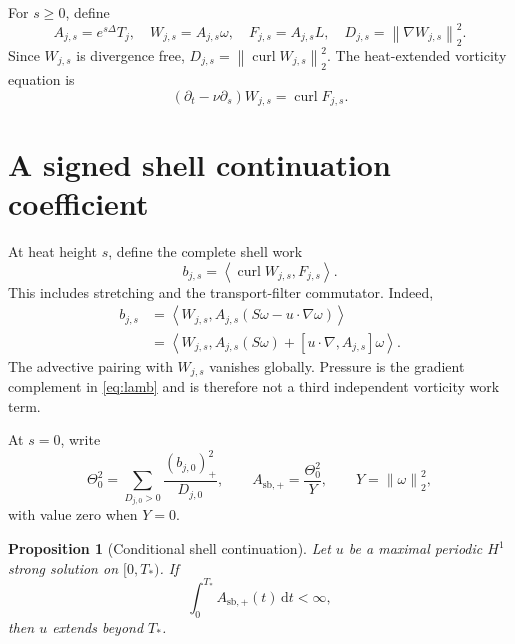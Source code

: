 \documentclass[11pt]{article}
\newtheorem{proposition}[theorem]{Proposition}
\theoremstyle{definition}
\newcommand{\curl}{\operatorname{curl}}
\newcommand{\ip}[2]{\left\langle #1,#2\right\rangle}
\newcommand{\norm}[1]{\left\lVert #1\right\rVert}
\newcommand{\pos}[1]{\left(#1\right)_{+}}
\newcommand{\dd}{\,\mathrm d}
\begin{document}
For \(s\ge0\), define
\begin{equation}\label{eq:heat-fields}
 A_{j,s}=e^{s\Delta}T_j,
 \quad W_{j,s}=A_{j,s}\omega,
 \quad F_{j,s}=A_{j,s}L,
 \quad D_{j,s}=\norm{\nabla W_{j,s}}_2^2.
\end{equation}
Since \(W_{j,s}\) is divergence free,
\(D_{j,s}=\norm{\curl W_{j,s}}_2^2\).  The heat-extended vorticity equation
is
\begin{equation}\label{eq:heat-vort}
 (\partial_t-\nu\partial_s)W_{j,s}=\curl F_{j,s}.
\end{equation}

\section{A signed shell continuation coefficient}\label{sec:criterion}

At heat height \(s\), define the complete shell work
\begin{equation}\label{eq:shell-work}
 b_{j,s}=\ip{\curl W_{j,s}}{F_{j,s}}.
\end{equation}
This includes stretching and the transport-filter commutator.  Indeed,
\begin{equation}\label{eq:compression}
\begin{aligned}
 b_{j,s}
 &=\ip{W_{j,s}}{A_{j,s}(S\omega-u\cdot\nabla\omega)}\\
 &=\ip{W_{j,s}}
 {A_{j,s}(S\omega)+[u\cdot\nabla,A_{j,s}]\omega}.
\end{aligned}
\end{equation}
The advective pairing with \(W_{j,s}\) vanishes globally.  Pressure is the
gradient complement in \eqref{eq:lamb} and is therefore not a third
independent vorticity work term.

At \(s=0\), write
\begin{equation}\label{eq:Asb}
 \Theta_0^2=\sum_{D_{j,0}>0}\frac{\pos{b_{j,0}}^2}{D_{j,0}},
 \qquad
 A_{\mathrm{sb},+}=\frac{\Theta_0^2}{Y},
 \qquad Y=\norm{\omega}_2^2,
\end{equation}
with value zero when \(Y=0\).

\begin{proposition}[Conditional shell continuation]\label{prop:continuation}
Let \(u\) be a maximal periodic \(H^1\) strong solution on
\([0,T_*)\).  If
\begin{equation}\label{eq:continuation-hyp}
 \int_0^{T_*}A_{\mathrm{sb},+}(t)\dd t<\infty,
\end{equation}
then \(u\) extends beyond \(T_*\).
\end{proposition}
\end{document}
